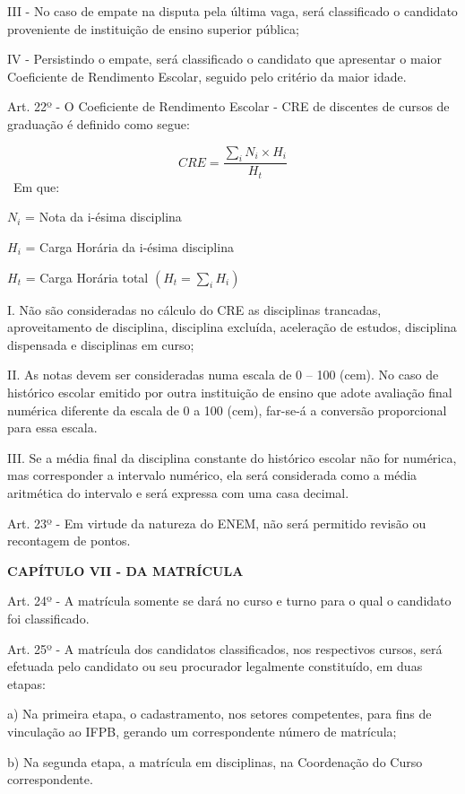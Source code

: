 III - No caso de empate na disputa pela última vaga, será classificado o candidato proveniente de instituição de ensino superior pública;

IV - Persistindo o empate, será classificado o candidato que apresentar o maior Coeficiente de Rendimento Escolar, seguido pelo critério da maior idade.

Art. 22º - O Coeficiente de Rendimento Escolar - CRE de discentes de cursos de graduação é definido como segue:

$$
CRE = \frac{\sum_{i} N_i \times H_i}{H_t}
$$
~Em que:

$N_i$ = Nota da i-\'esima disciplina

$H_i$ = Carga Horária da i-\'esima disciplina

$H_t$ = Carga Hor\'aria total $(H_t = \sum_{i} H_i)$

I. Não são consideradas no cálculo do CRE as disciplinas trancadas, aproveitamento de disciplina, disciplina excluída, aceleração de estudos, disciplina dispensada e disciplinas em curso;

II. As notas devem ser consideradas numa escala de 0 – 100 (cem). No caso de histórico escolar emitido por outra instituição de ensino que adote avaliação final numérica diferente da escala de 0 a 100 (cem), far-se-á a conversão proporcional para essa escala.

III. Se a média final da disciplina constante do histórico escolar não for numérica, mas corresponder a intervalo numérico, ela será considerada como a média aritmética do intervalo e será expressa com uma casa decimal.

Art. 23º - Em virtude da natureza do ENEM, não será permitido revisão ou recontagem de pontos.

\vspace{4mm}
\textbf{CAPÍTULO VII - DA MATRÍCULA}
\vspace{4mm}


Art. 24º - A matrícula somente se dará no curso e turno para o qual o candidato foi classificado.

Art. 25º - A matrícula dos candidatos classificados, nos respectivos cursos, será efetuada pelo candidato ou seu procurador legalmente constituído, em duas etapas:

a) Na primeira etapa, o cadastramento, nos setores competentes, para fins de vinculação ao IFPB, gerando um correspondente número de matrícula;

b) Na segunda etapa, a matrícula em disciplinas, na Coordenação do Curso correspondente.

